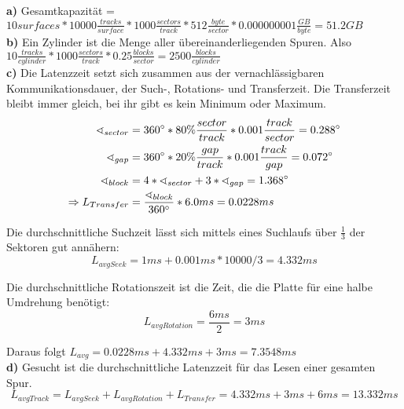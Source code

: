 \documentclass[12pt]{article}
\begin{document}
\textbf{a)} Gesamtkapazität = $10 surfaces * 10000 \frac{tracks}{surface} *
1000 \frac{sectors}{track} * 512 \frac{byte}{sector} * 0.000000001
\frac{GB}{byte} = 51.2GB$
\\[1em]
\textbf{b)} Ein Zylinder ist die Menge aller übereinanderliegenden Spuren.
Also $10 \frac{tracks}{cylinder} * 1000 \frac{sectors}{track} * 0.25
\frac{blocks}{sector} = 2500\frac{blocks}{cylinder}$
\\[1em]
\textbf{c)}  
Die Latenzzeit setzt sich zusammen aus der vernachlässigbaren
Kommunikationsdauer, der Such-, Rotations- und Transferzeit. Die Transferzeit
bleibt immer gleich, bei ihr gibt es kein Minimum oder Maximum.
\begin{align*}
    \sphericalangle_{sector} &= 360\degree * 80\% \frac{sector}{track} * 0.001\frac{track}{sector} = 0.288\degree\\
    \sphericalangle_{gap} &= 360\degree * 20\% \frac{gap}{track} * 0.001\frac{track}{gap} = 0.072\degree\\
    \sphericalangle_{block} &= 4 * \sphericalangle_{sector} + 3 * \sphericalangle_{gap} = 1.368\degree\\
    \Rightarrow L_{Transfer} &= \frac{\sphericalangle_{block}}{360\degree} * 6.0ms = 0.0228ms
\end{align*}

Die durchschnittliche Suchzeit lässt sich mittels eines Suchlaufs über
$\frac{1}{3}$ der Sektoren gut annähern:
$$L_{avgSeek} = 1ms + 0.001ms * 10000/3 = 4.332ms$$

Die durchschnittliche Rotationszeit ist die Zeit, die die Platte für eine halbe
Umdrehung benötigt:
$$L_{avgRotation} = \frac{6ms}{2} = 3ms$$

Daraus folgt $L_{avg} = 0.0228ms + 4.332ms + 3ms = 7.3548ms$
\\[1em]
\textbf{d)} Gesucht ist die durchschnittliche Latenzzeit für das Lesen einer gesamten Spur.
$$L_{avgTrack} = L_{avgSeek} + L_{avgRotation} + L_{Transfer} = 4.332ms + 3ms + 6ms = 13.332ms$$
\end{document}
